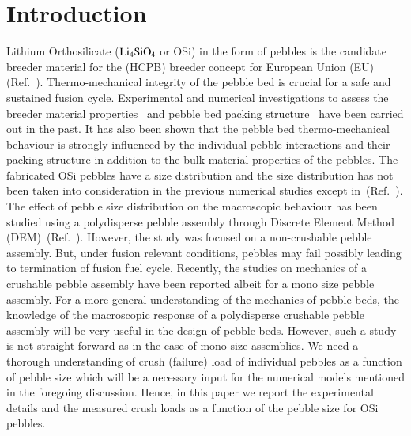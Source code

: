 \section{Introduction}\label{sec:introduction}
Lithium Orthosilicate ($\rm{Li}_4\rm{SiO}_4$ or OSi) in the form of pebbles is the candidate breeder material for the  (HCPB) breeder concept for European Union (EU) (Ref.~). Thermo-mechanical integrity of the pebble bed is crucial for a safe and sustained fusion cycle.\citep{Ying2012} Experimental and numerical investigations to assess the breeder material properties~\citep{Reimann2000,Piazza2001a,Piazza2002,Buhler2002,An2005,Reimann2006,Knitter2007} and pebble bed packing structure~\citep{Reimann2003a,Reimann2008,Gan2010b} have been carried out in the past. It has also been shown that the pebble bed thermo-mechanical behaviour is strongly influenced by the individual pebble interactions and their packing structure in addition to the bulk material properties of the pebbles.\citep{Gan2010e,Zhao2012,Annabattula2012,Annabattula2012a,Zhao2013} The fabricated OSi pebbles have a size distribution and the size distribution has not been taken into consideration in the previous numerical studies except in~(Ref.~). The effect of pebble size distribution on the macroscopic behaviour has been studied using a polydisperse pebble assembly through Discrete Element Method (DEM)~(Ref.~). However, the study was focused on a non-crushable pebble assembly. But, under fusion relevant conditions, pebbles may fail possibly leading to termination of fusion fuel cycle. Recently, the studies on mechanics of a crushable pebble assembly have been reported albeit for a mono size pebble assembly.\citep{Gan2011,Zhao2012,Annabattula2012a,Zhao2013} For a more general understanding of the mechanics of pebble beds, the knowledge of the macroscopic response of a polydisperse crushable pebble assembly will be very useful in the design of pebble beds. However, such a study is not straight forward as in the case of mono size assemblies. We need a thorough understanding of crush (failure) load of individual pebbles as a function of pebble size which will be a necessary input for the numerical models mentioned in the foregoing discussion. Hence, in this paper we report the experimental details and the measured crush loads as a function of the pebble size for OSi pebbles.

